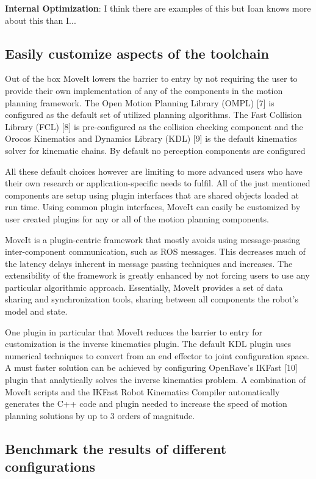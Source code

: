 \documentclass[10pt,journal,compsoc]{joser1}
\begin{document}
{{\bf Internal Optimization}: I think there are examples of this but Ioan knows more about this than I...

\subsection{Easily customize aspects of the toolchain}

Out of the box MoveIt lowers the barrier to entry by not requiring the user to provide their own implementation of any of the components in the motion planning framework. The Open Motion Planning Library (OMPL) [7] is configured as the default set of utilized planning algorithms. The Fast Collision Library (FCL) [8] is pre-configured as the collision checking component and the Orocos Kinematics and Dynamics Library (KDL) [9] is the default kinematics solver for kinematic chains. By default no perception components are configured

All these default choices however are limiting to more advanced users who have their own research or application-specific needs to fulfil. All of the just mentioned components are setup using plugin interfaces that are shared objects loaded at run time. Using common plugin interfaces, MoveIt can easily be customized by user created plugins for any or all of the motion planning components.

MoveIt is a plugin-centric framework that mostly avoids using message-passing inter-component communication, such as ROS messages. This decreases much of the latency delays inherent in message passing techniques and increases. The extensibility of the framework is greatly enhanced by not forcing users to use any particular algorithmic approach. Essentially, MoveIt provides a set of data sharing and synchronization tools, sharing between all components the robot's model and state.

One plugin in particular that MoveIt reduces the barrier to entry for customization is the inverse kinematics plugin. The default KDL plugin uses numerical techniques to convert from an end effector to joint configuration space. A must faster solution can be achieved by configuring OpenRave's IKFast [10] plugin that analytically solves the inverse kinematics problem. A combination of MoveIt scripts and the IKFast Robot Kinematics Compiler automatically generates the C++ code and plugin needed to increase the speed of motion planning solutions by up to 3 orders of magnitude.

\subsection{Benchmark the results of different configurations}

}
\end{document}
